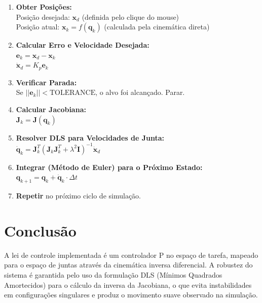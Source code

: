 \documentclass[a4paper, 12pt]{article}
\begin{document}
\begin{enumerate}
    \item \textbf{Obter Posições:} \\
    Posição desejada: $\mathbf{x}_d$ (definida pelo clique do mouse) \\
    Posição atual: $\mathbf{x}_k = f(\mathbf{q}_k)$ (calculada pela cinemática direta)
    
    \item \textbf{Calcular Erro e Velocidade Desejada:} \\
    $\mathbf{e}_k = \mathbf{x}_d - \mathbf{x}_k$ \\
    $\dot{\mathbf{x}}_d = K_p \mathbf{e}_k$
    
    \item \textbf{Verificar Parada:} \\
    Se $|| \mathbf{e}_k || < \text{TOLERANCE}$, o alvo foi alcançado. Parar.
    
    \item \textbf{Calcular Jacobiana:} \\
    $\mathbf{J}_k = \mathbf{J}(\mathbf{q}_k)$
    
    \item \textbf{Resolver DLS para Velocidades de Junta:} \\
    $\dot{\mathbf{q}}_k = \mathbf{J}_k^T (\mathbf{J}_k \mathbf{J}_k^T + \lambda^2 \mathbf{I})^{-1} \dot{\mathbf{x}}_d$
    
    \item \textbf{Integrar (Método de Euler) para o Próximo Estado:} \\
    $\mathbf{q}_{k+1} = \mathbf{q}_k + \dot{\mathbf{q}}_k \cdot \Delta t$
    
    \item \textbf{Repetir} no próximo ciclo de simulação.
\end{enumerate}

\section{Conclusão}
A lei de controle implementada é um controlador P no espaço de tarefa, mapeado para o espaço de juntas através da cinemática inversa diferencial. A robustez do sistema é garantida pelo uso da formulação DLS (Mínimos Quadrados Amortecidos) para o cálculo da inversa da Jacobiana, o que evita instabilidades em configurações singulares e produz o movimento suave observado na simulação.
\end{document}
